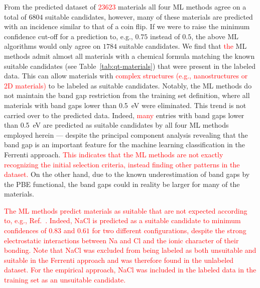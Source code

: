 \documentclass[superscriptaddress,unsortedaddress,
 amsmath,amssymb,
 aps,
]{revtex4-2}
\newcommand{\mrk}[1]{\textcolor{red}{#1}}
\begin{document}
From the predicted dataset of \mrk{\num{23623}} materials  
all four ML methods agree on a total of $6804$ suitable candidates, however, many of these materials are predicted with an incidence similar to that of a coin flip. If we were to raise the minimum confidence cut-off for a prediction to, e.g., $0.75$ instead of $0.5$, the above ML algorithms would only agree on $1784$ suitable candidates. 
We find that \mrk{the} ML methods admit almost all materials with a chemical formula matching the known suitable candidates (see Table~\ref{tab:qt-materials}) that were present in the labeled data. This can allow materials with \mrk{complex structures (e.g., nanostructures or 2D materials)} to be labeled as suitable candidates. Notably, the ML methods do not maintain the band gap restriction from the training set definition, where all materials with band gaps lower than \SI{0.5}{\electronvolt} were eliminated. 
This trend is not carried over to the predicted data. Indeed, \mrk{many} entries with band gaps lower than \SI{0.5}{\electronvolt} are predicted as suitable candidates by all four ML methods employed herein 
--- despite the principal component analysis revealing that the band gap is an important feature for the machine learning classification in the Ferrenti approach. \mrk{This indicates that the ML methods are not exactly recognizing the initial selection criteria, instead finding other patterns in the dataset.} 
On the other hand, due to the known  underestimation of band gaps by the PBE  functional, the band gaps could in reality be larger for many of the materials. 

\mrk{The ML methods predict materials as suitable that are not expected according to, e.g., Ref.~\cite{Weber2010}. Indeed, NaCl is predicted as a suitable candidate to minimum confidences of $0.83$ and $0.61$ for two different configurations, despite the strong electrostatic interactions between Na and Cl and the ionic character of their bonding. Note that NaCl was excluded from being labeled as both unsuitable and suitable in the Ferrenti approach and was therefore found in the unlabeled dataset. For the empirical approach, NaCl was included in the labeled data in the training set as an unsuitable candidate. }
\end{document}

